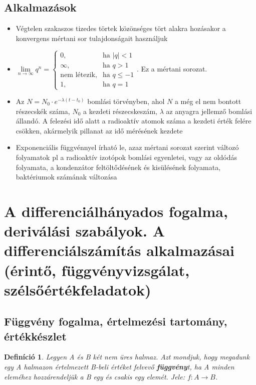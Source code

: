 \documentclass[12pt,a4paper]{article}
\newtheorem{definition}{Definíció} [section]
\begin{document}
\subsection{Alkalmazások}
\begin{itemize}
\item Végtelen szakaszos tizedes törtek közönséges tört alakra hozásakor a konvergens mértani sor tulajdonságait használjuk
\item $\lim\limits_{n\to \infty} q^n=\begin{cases} 0, & \text{ha } |q|<1 \\ \infty, & \text{ha } q>1 \\ \text{nem létezik}, & \text{ha } q\leq -1 \\ 1, & \text{ha }q=1 \end{cases}$. Ez a mértani sorozat.
\item Az $N=N_0\cdot e^{-\lambda (t-t_0)}$ bomlási törvényben, ahol $N$ a még el nem bontott részecskék száma, $N_0$ a kezdeti részecskeszám, $\lambda$ az anyagra jellemző bomlási állandó. A felezési idő alatt a radioaktív atomok száma a kezdeti érték felére csökken, akármelyik pillanat az idő mérésének kezdete
\item  Exponenciális függvénnyel írható le, azaz mértani sorozat szerint változó folyamatok pl a radioaktív izotópok bomlási egyenletei, vagy az oldódás folyamata, a kondenzátor feltöltődésének és kisülésének folyamata, baktériumok számának változása
\end{itemize}
\newpage





\section{A differenciálhányados fogalma, deriválási szabályok. A differenciálszámítás alkalmazásai (érintő, függvényvizsgálat, szélsőértékfeladatok)}

\subsection{Függvény fogalma, értelmezési tartomány, értékkészlet}

\begin{definition}
Legyen A és B két nem üres halmaz. Azt mondjuk, hogy megadunk egy A halmazon értelmezett B-beli értéket felvevő \textbf{függvény}t, ha A minden eleméhez hozzárendeljük a B egy és csakis egy elemét. Jele: $f: A \rightarrow B$.
\end{definition}
\end{document}
